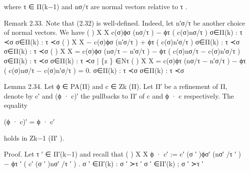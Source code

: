 \documentclass[
  11pt,
]{article}
\newenvironment{Shaded}{}{}
\newcommand{\NormalTok}[1]{#1}
\begin{document}
\begin{Shaded}
\begin{Highlighting}[]
\NormalTok{where τ ∈ Π(k−1) and nσ/τ are normal vectors relative to τ .}

\NormalTok{Remark 2.33. Note that (2.32) is well{-}defined. Indeed, let n′σ/τ be another choice of normal}
\NormalTok{vectors. We have}
\NormalTok{                                  (                )}
\NormalTok{        X                           X}
\NormalTok{              c(σ)ϕσ (nσ/τ ) − ϕτ (       c(σ)nσ/τ )}
\NormalTok{     σ∈Π(k) : τ ≺σ                                    σ∈Π(k) : τ ≺σ}
\NormalTok{                                                                      (                              )}
\NormalTok{                             X                                                X}
\NormalTok{                     −                   c(σ)ϕσ (n′σ/τ ) + ϕτ (                           c(σ)n′σ/τ )}
\NormalTok{                         σ∈Π(k) : τ ≺σ                                    σ∈Π(k) : τ ≺σ}
\NormalTok{                                                                                (                                                    )}
\NormalTok{                             X                                                            X}
\NormalTok{                     =                 c(σ)ϕσ (nσ/τ − n′σ/τ ) − ϕτ (              c(σ)nσ/τ − c(σ)n′σ/τ )}
\NormalTok{                         σ∈Π(k) : τ ≺σ                              σ∈Π(k) : τ ≺σ}
\NormalTok{                                               |    \{z    \}}
\NormalTok{                                                             ∈Nτ}
\NormalTok{                                                                                (                                                    )}
\NormalTok{                             X                                                            X}
\NormalTok{                     =                   c(σ)ϕτ (nσ/τ − n′σ/τ ) − ϕτ (                             c(σ)nσ/τ − c(σ)n′σ/τ ) = 0.}
\NormalTok{                         σ∈Π(k) : τ ≺σ                                             σ∈Π(k) : τ ≺σ}

\NormalTok{Lemma 2.34. Let ϕ ∈ PA(Π) and c ∈ Zk (Π). Let Π′ be a refinement of Π, denote by c′ and (ϕ · c)′}
\NormalTok{the pullbacks to Π′ of c and ϕ · c respectively. The equality}

\NormalTok{                                                               (ϕ · c)′ = ϕ · c′}

\NormalTok{holds in Zk−1 (Π′ ).}


\NormalTok{Proof. Let τ ′ ∈ Π′(k−1) and recall that}
\NormalTok{                                                                                   (                                         )}
\NormalTok{                                    X                                                        X}
\NormalTok{                ϕ · c′ :=                            c′ (σ ′ )ϕσ′ (nσ′ /τ ′ ) − ϕτ ′ (                       c′ (σ ′ )nσ′ /τ ′ ) .}
\NormalTok{                             σ ′ ∈Π′(k) : σ ′ ≻τ ′                                   σ ′ ∈Π′(k) ; σ ′ ≻τ ′}



\end{Highlighting}
\end{Shaded}
\end{document}
